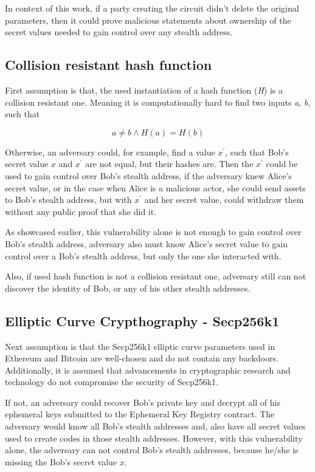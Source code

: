 In context of this work, if a party creating the circuit didn't delete the
original parameters, then it could prove malicious statements about ownership
of the secret values needed to gain control over any stealth address.


\subsection{Collision resistant hash function}\label{crhf}

First assumption is that, the used instantiation of a hash function (\textit{H})
is a collision resistant one. Meaning it is computationally hard to find two
inputs \textit{a}, \textit{b}, such that

\[ a \neq b \land H(a) = H(b) \]

Otherwise, an adversary could, for example, find a value $x^\prime$,
such that Bob's secret value $x$ and $x^\prime$ are not equal, but their hashes
are. Then the $x^\prime$ could be used to gain control over Bob's stealth address,
if the adversary knew Alice's secret value, or in the case when Alice is a malicious
actor, she could send assets to Bob's stealth address, but with $x^\prime$ and
her secret value, could withdraw them without any public proof that she did it.

As showcased earlier, this vulnerability alone is not enough to gain control
over Bob's stealth address, adversary also must know Alice's secret value to
gain control over a Bob's stealth address, but only the one she interacted with.

Also, if used hash function is not a collision resistant one, adversary still can not
discover the identity of Bob, or any of his other stealth addresses.

\subsection{Elliptic Curve Crypthography - Secp256k1}

Next assumption is that the Secp256k1 elliptic curve parameters used in Ethereum
and Bitcoin\cite{bitcoinSecp256k1Bitcoin} are well-chosen and do not contain any backdoors. Additionally, it is
assumed that advancements in cryptographic research and technology do not
compromise the security of Secp256k1.

If not, an adversary could recover Bob's private key and decrypt all of his
ephemeral keys submitted to the Ephemeral Key Registry contract. The
adversary would know all Bob's stealth addresses and, also have all secret
values used to create codes in those stealth addresses. However, with this
vulnerability alone, the adversary can not control Bob's stealth addresses,
because he/she is missing the Bob's secret value $x$.

